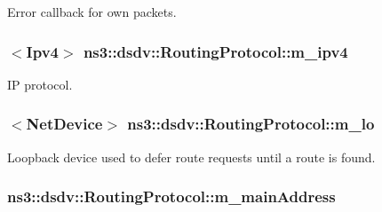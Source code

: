 Error callback for own packets. 

\subsubsection[{\texorpdfstring{m\+\_\+ipv4}{m_ipv4}}]{$<${\bf Ipv4}$>$ ns3\+::dsdv\+::\+Routing\+Protocol\+::m\+\_\+ipv4\hspace{0.3cm}{\ttfamily [private]}}\hypertarget{classns3_1_1dsdv_1_1RoutingProtocol_a955477c7f38e64762a264c24e3762af6}{}\label{classns3_1_1dsdv_1_1RoutingProtocol_a955477c7f38e64762a264c24e3762af6}


IP protocol. 

\subsubsection[{\texorpdfstring{m\+\_\+lo}{m_lo}}]{$<${\bf Net\+Device}$>$ ns3\+::dsdv\+::\+Routing\+Protocol\+::m\+\_\+lo\hspace{0.3cm}{\ttfamily [private]}}\hypertarget{classns3_1_1dsdv_1_1RoutingProtocol_a793deb930065a91d037ed2930e756528}{}\label{classns3_1_1dsdv_1_1RoutingProtocol_a793deb930065a91d037ed2930e756528}


Loopback device used to defer route requests until a route is found. 

\subsubsection[{\texorpdfstring{m\+\_\+main\+Address}{m_mainAddress}}]{ ns3\+::dsdv\+::\+Routing\+Protocol\+::m\+\_\+main\+Address\hspace{0.3cm}{\ttfamily [private]}}\hypertarget{classns3_1_1dsdv_1_1RoutingProtocol_af7cb076b88eb5ff20a1c146e3f5849f6}{}\label{classns3_1_1dsdv_1_1RoutingProtocol_af7cb076b88eb5ff20a1c146e3f5849f6}


